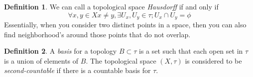 \documentclass[12pt]{book}
\theoremstyle{definition}
\newtheorem*{definition}{Definition}
\begin{document}
\begin{definition}
    We can call a topological space \textit{Hausdorff} if and only if $$\forall x, y \in X x \neq y, \exists U_x, U_y \in \tau; U_x \cap U_y = \phi$$
    Essentially, when you consider two distinct points in a space, then you can also find neighborhood's around those points that do not overlap. 
\end{definition}
\begin{definition}
    A \textit{basis} for a topology $B \subset \tau$ is a set such that each open set in $\tau$ is a union of elements of $B$. The topological space $(X, \tau)$ is considered to be \textit{second-countable} if there is a countable basis for $\tau$.
\end{definition}
\end{document}
